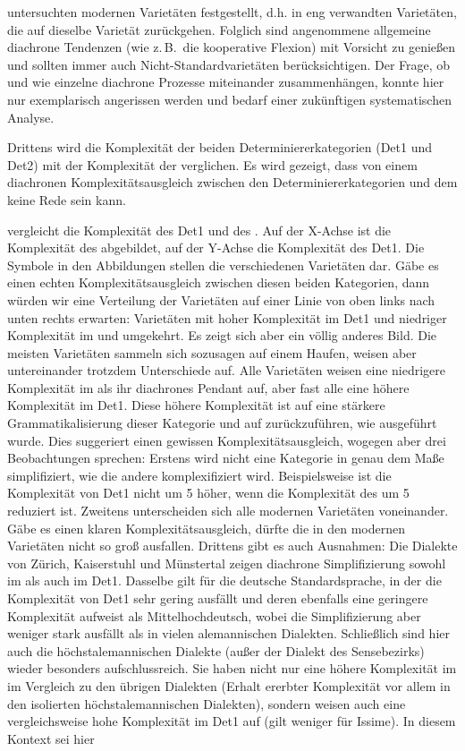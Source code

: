untersuchten modernen Varietäten festgestellt, d.h. in eng verwandten Varietäten, die auf dieselbe Varietät zurückgehen. Folglich sind angenommene allgemeine diachrone Tendenzen (wie z.\,B.\ die kooperative Flexion) mit Vorsicht zu genießen und sollten immer auch Nicht-Stan\-dard\-va\-ri\-e\-tä\-ten berücksichtigen. Der Frage, ob und wie einzelne diachrone Prozesse miteinander zusammenhängen, konnte hier nur exemplarisch angerissen werden und bedarf einer zukünftigen systematischen Analyse.

Drittens wird die Komplexität der beiden Determiniererkategorien (Det1 und Det2) mit der Komplexität der  verglichen. Es wird gezeigt, dass von einem diachronen Komplexitätsausgleich zwischen den Determiniererkategorien und dem  keine Rede sein kann.

 vergleicht die Komplexität des Det1 und des . Auf der X-Achse ist die Komplexität des  abgebildet, auf der Y-Achse die Komplexität des Det1. Die Symbole in den Abbildungen stellen die verschiedenen Varietäten dar. Gäbe es einen echten Komplexitätsausgleich zwischen diesen beiden Kategorien, dann würden wir eine Verteilung der Varietäten auf einer Linie von oben links nach unten rechts erwarten: Varietäten mit hoher Komplexität im Det1 und niedriger Komplexität im  und umgekehrt. Es zeigt sich aber ein völlig anderes Bild. Die meisten Varietäten sammeln sich sozusagen auf einem Haufen, weisen aber untereinander trotzdem Unterschiede auf. Alle Varietäten weisen eine niedrigere Komplexität im  als ihr diachrones Pendant auf, aber fast alle eine höhere Komplexität im Det1. Diese höhere Komplexität ist auf eine stärkere Grammatikalisierung dieser Kategorie und auf  zurückzuführen, wie ausgeführt wurde. Dies suggeriert einen gewissen Komplexitätsausgleich, wogegen aber drei Beobachtungen sprechen: Erstens wird nicht eine Kategorie in genau dem Maße simplifiziert, wie die andere komplexifiziert wird. Beispielsweise ist die Komplexität von Det1 nicht um 5 höher, wenn die Komplexität des  um 5 reduziert ist. Zweitens unterscheiden sich alle modernen Varietäten voneinander. Gäbe es einen klaren Komplexitätsausgleich, dürfte die  in den modernen Varietäten nicht so groß ausfallen. Drittens gibt es auch Ausnahmen: Die Dialekte von Zürich, Kaiserstuhl und Münstertal zeigen diachrone Simplifizierung sowohl im  als auch im Det1. Dasselbe gilt für die deutsche Standardsprache, in der die Komplexität von Det1 sehr gering ausfällt und deren  ebenfalls eine geringere Komplexität aufweist als Mittelhochdeutsch, wobei die Simplifizierung aber weniger stark ausfällt als in vielen alemannischen Dialekten. Schließlich sind hier auch die höchstalemannischen Dialekte (außer der Dialekt des Sensebezirks) wieder besonders aufschlussreich. Sie haben nicht nur eine höhere Komplexität im  im Vergleich zu den übrigen Dialekten (Erhalt ererbter Komplexität vor allem in den isolierten höchstalemannischen Dialekten), sondern weisen auch eine vergleichsweise hohe Komplexität im Det1 auf (gilt weniger für Issime). In diesem Kontext sei hier 